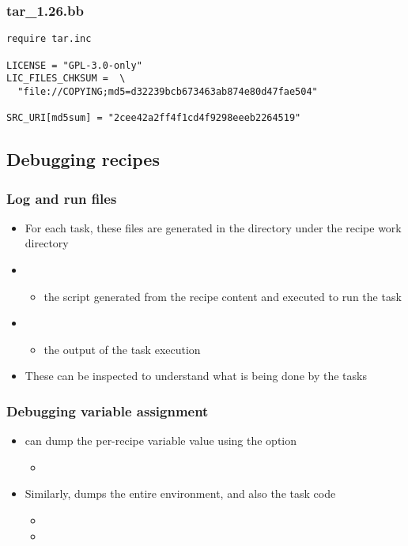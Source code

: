 \begin{frame}[fragile]
  \frametitle{tar\_1.26.bb}
  \begin{block}{}
    \begin{verbatim}
require tar.inc

LICENSE = "GPL-3.0-only"
LIC_FILES_CHKSUM =  \
  "file://COPYING;md5=d32239bcb673463ab874e80d47fae504"

SRC_URI[md5sum] = "2cee42a2ff4f1cd4f9298eeeb2264519"
    \end{verbatim}
  \end{block}
\end{frame}

\subsection{Debugging recipes}

\begin{frame}
  \frametitle{Log and run files}
  \begin{itemize}
    \item For each task, these files are generated in the 
      directory under the recipe work directory
    \item {}
      \begin{itemize}
      \item the script generated from the recipe content and executed to
        run the task
      \end{itemize}
    \item {}
      \begin{itemize}
      \item the output of the task execution
      \end{itemize}
    \item These can be inspected to understand what is being done by the
      tasks
  \end{itemize}
\end{frame}

\begin{frame}[fragile]
  \frametitle{Debugging variable assignment}
  \begin{itemize}
    \item {} can dump the per-recipe variable value
      using the \code{-r} option
      \begin{itemize}
      \item {}
      \end{itemize}
    \item Similarly,  dumps the entire environment, and
      also the task code
      \begin{itemize}
      \item {}
      \item {}
      \end{itemize}
  \end{itemize}
\end{frame}
